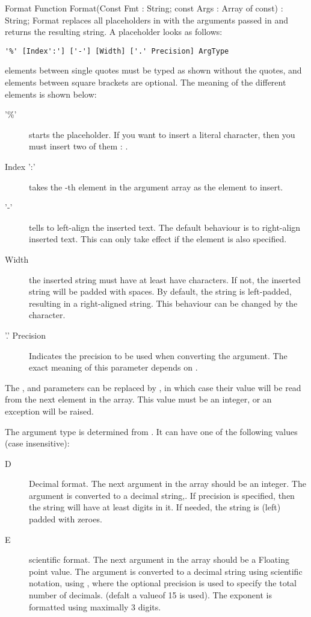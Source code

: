 \begin{function}{Format}
\Declaration
Function Format(Const Fmt : String; const Args : Array of const) : String;
\Description
Format replaces all placeholders in with the arguments passed in
 and returns the resulting string. A placeholder looks as follows:
\begin{verbatim}
'%' [Index':'] ['-'] [Width] ['.' Precision] ArgType
\end{verbatim}
elements between single quotes must be typed as shown without the quotes,
and elements between square brackets \var{[ ]} are optional. The meaning
of the different elements is shown below:
\begin{description}
\item['\%'] starts the placeholder. If you want to insert a literal
\var{\%} character, then you must insert two of them : \var{\%\%}.
\item[Index ':'] takes the -th element in the argument array
as the element to insert.
\item['-'] tells  to left-align the inserted text. The default
behaviour is to right-align inserted text. This can only take effect if the
 element is also specified.
\item[Width] the inserted string must have at least have 
characters. If not, the inserted string will be padded with spaces. By
default, the string is left-padded, resulting in a right-aligned string.
This behaviour can be changed by the  character.
\item['.' Precision] Indicates the precision to be used when converting
the argument. The exact meaning of this parameter depends on .
\end{description}
The ,  and  parameters can be replaced
by \var{*}, in which case their value will be read from the next element in
the  array. This value must be an integer, or an
 exception will be raised.

The argument type is determined from . It can have one of the
following values (case insensitive):
\begin{description}
\item[D] Decimal format. The next argument in the  array should be
an integer. The argument is converted to a decimal string,. If precision is
specified, then the string will have at least  digits in it.
If needed, the string is (left) padded with zeroes.
\item[E] scientific format. The next argument in the  array should
be a Floating point value. The argument is converted to a decimal string
using scientific notation, using , where the optional
precision is used to specify the total number of decimals. (defalt a valueof
15 is used). The exponent is formatted using maximally 3 digits.


\end{description}
\end{function}
